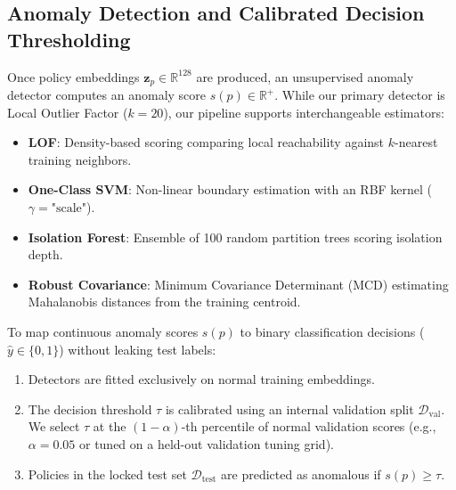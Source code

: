 \subsection{Anomaly Detection and Calibrated Decision Thresholding}
Once policy embeddings $\mathbf{z}_p \in \mathbb{R}^{128}$ are produced, an unsupervised anomaly detector computes an anomaly score $s(p) \in \mathbb{R}^+$. While our primary detector is Local Outlier Factor ($k=20$), our pipeline supports interchangeable estimators:
\begin{itemize}
    \item \textbf{LOF}: Density-based scoring comparing local reachability against $k$-nearest training neighbors.
    \item \textbf{One-Class SVM}: Non-linear boundary estimation with an RBF kernel ($\gamma = \text{"scale"}$).
    \item \textbf{Isolation Forest}: Ensemble of 100 random partition trees scoring isolation depth.
    \item \textbf{Robust Covariance}: Minimum Covariance Determinant (MCD) estimating Mahalanobis distances from the training centroid.
\end{itemize}

To map continuous anomaly scores $s(p)$ to binary classification decisions ($\hat{y} \in \{0, 1\}$) without leaking test labels:
\begin{enumerate}
    \item Detectors are fitted exclusively on normal training embeddings.
    \item The decision threshold $\tau$ is calibrated using an internal validation split $\mathcal{D}_{\text{val}}$. We select $\tau$ at the $(1 - \alpha)$-th percentile of normal validation scores (e.g., $\alpha = 0.05$ or tuned on a held-out validation tuning grid).
    \item Policies in the locked test set $\mathcal{D}_{\text{test}}$ are predicted as anomalous if $s(p) \ge \tau$.
\end{enumerate}

